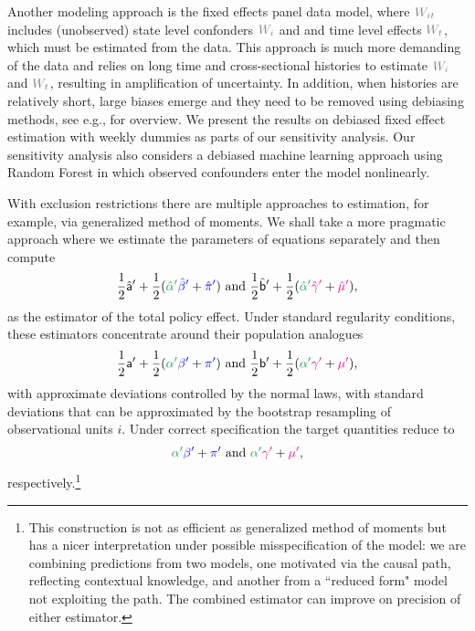 \documentclass[11pt,reqno,letter]{amsart}
\theoremstyle{definition}
\def\bcolor{\color{ForestGreen}}
\def\pcolor{\color{blue}}
\def\icolor{\color{magenta}}
\def\wcolor{\color{gray}}
\begin{document}
Another modeling approach is the fixed effects panel data model, where ${\wcolor W_{it}}$ includes
 (unobserved) state level confonders ${\wcolor W_i}$ and  and time level effects ${\wcolor W_t}$,
which must be estimated from the data.  This approach is much more demanding of the data and relies on long time and cross-sectional histories to estimate ${\wcolor W_i}$ and ${\wcolor W_t}$, resulting in amplification of uncertainty. In addition, when histories are relatively short,  large biases emerge and they need to be removed using debiasing methods, see e.g., \cite{chen2019mastering} for overview. We present the results
on debiased fixed effect estimation with weekly dummies as parts of our sensitivity analysis. Our sensitivity analysis also considers a debiased machine learning approach  using Random Forest in which observed confounders enter the model nonlinearly.


With exclusion restrictions there are multiple approaches to estimation, for example,
via generalized method of moments. We shall take a more pragmatic approach where we estimate
the parameters of equations separately and then compute
\[
 \frac{1}{2} \hat {\mathsf{a}}'  + \frac{1}{2}  ( {\bcolor \hat \alpha '}  {\pcolor \hat \beta' }+{\pcolor\hat \pi'} ) \text{ and }
 \frac{1}{2} \hat{\mathsf{b}}'  + \frac{1}{2}  ( {\bcolor \hat \alpha '}  {\icolor \hat \gamma'} + {\icolor \hat \mu'}),
\]
as the estimator of the total policy effect. Under standard regularity conditions,
these estimators concentrate around  their population analogues
\[
 \frac{1}{2}  {\mathsf{a}}'  + \frac{1}{2}  ( {\bcolor \alpha '}  {\pcolor \beta' }+{\pcolor \pi'} ) \text{ and }
 \frac{1}{2} {\mathsf{b}}'  + \frac{1}{2}  ( {\bcolor  \alpha '}  {\icolor \gamma'} + {\icolor \mu'}),
\]
with approximate deviations controlled by the normal laws, with standard deviations that can be approximated by the bootstrap
resampling of observational units $i$. Under correct specification the target quantities
reduce to $$  {\bcolor \alpha '}  {\pcolor  \beta' }+{\pcolor \pi'} \text{ and } {\bcolor  \alpha '}  {\icolor  \gamma'} + {\icolor  \mu'},$$ respectively.\footnote{This construction is not as efficient as generalized method of moments
but has a nicer interpretation under possible misspecification of the model: we are combining predictions
from two models, one motivated via the causal path, reflecting contextual knowledge, and another from a ``reduced form" model not exploiting the path. The combined estimator can improve on precision of either estimator.}
\end{document}
